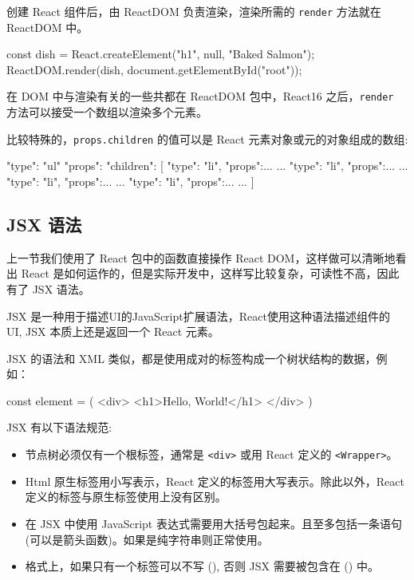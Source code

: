 创建 React 组件后，由 ReactDOM 负责渲染，渲染所需的 \texttt{render} 方法就在 ReactDOM 中。

\begin{JavaScript}
const dish = React.createElement("h1", null, "Baked Salmon");
ReactDOM.render(dish, document.getElementById("root"));
\end{JavaScript}

在 DOM 中与渲染有关的一些共都在 ReactDOM 包中，React16 之后，\texttt{render} 方法可以接受一个数组以渲染多个元素。

比较特殊的，\texttt{props.children} 的值可以是 React 元素对象或元的对象组成的数组:

\begin{JavaScript}
{
    "type": "ul"
    "props": {
        "children": [
            {"type": "li", "props":{...} ...}
            {"type": "li", "props":{...} ...}
            {"type": "li", "props":{...} ...}
            {"type": "li", "props":{...} ...}
        ]
    }
}
\end{JavaScript}

\subsection{JSX 语法}

上一节我们使用了 React 包中的函数直接操作 React DOM，这样做可以清晰地看出 React 是如何运作的，但是实际开发中，这样写比较复杂，可读性不高，因此有了 JSX 语法。

JSX 是一种用于描述UI的JavaScript扩展语法，React使用这种语法描述组件的 UI, JSX 本质上还是返回一个 React 元素。

JSX 的语法和 XML 类似，都是使用成对的标签构成一个树状结构的数据，例如：

\begin{JavaScript}
const element = (
    <div>
        <h1>Hello, World!</h1>
    </div>
)
\end{JavaScript}

JSX 有以下语法规范:
\begin{itemize}
    \item 节点树必须仅有一个根标签，通常是 \texttt{<div>} 或用 React 定义的 \texttt{<Wrapper>}。
    \item Html 原生标签用小写表示，React 定义的标签用大写表示。除此以外，React 定义的标签与原生标签使用上没有区别。
    \item 在 JSX 中使用 JavaScript 表达式需要用大括号包起来。且至多包括一条语句(可以是箭头函数)。如果是纯字符串则正常使用。
    \item 格式上，如果只有一个标签可以不写 (), 否则 JSX 需要被包含在 () 中。
\end{itemize}

